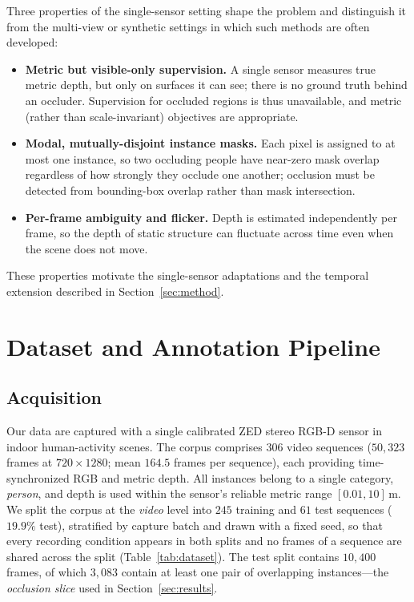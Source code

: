 \documentclass[sigconf, review=true]{acmart}
\begin{document}
Three properties of the single-sensor setting shape the problem and distinguish
it from the multi-view or synthetic settings in which such methods are often
developed:
\begin{itemize}
  \item \textbf{Metric but visible-only supervision.} A single sensor measures
    true metric depth, but only on surfaces it can see; there is no ground truth
    behind an occluder. Supervision for occluded regions is thus unavailable,
    and metric (rather than scale-invariant) objectives are appropriate.
  \item \textbf{Modal, mutually-disjoint instance masks.} Each pixel is assigned
    to at most one instance, so two occluding people have near-zero mask overlap
    regardless of how strongly they occlude one another; occlusion must be
    detected from bounding-box overlap rather than mask intersection.
  \item \textbf{Per-frame ambiguity and flicker.} Depth is estimated
    independently per frame, so the depth of static structure can fluctuate
    across time even when the scene does not move.
\end{itemize}
These properties motivate the single-sensor adaptations and the temporal
extension described in Section~\ref{sec:method}.

\section{Dataset and Annotation Pipeline}
\label{sec:dataset}

\subsection{Acquisition}
Our data are captured with a single calibrated ZED stereo RGB-D sensor in
indoor human-activity scenes. The corpus comprises $306$ video sequences
($50{,}323$ frames at $720\times1280$; mean $164.5$ frames per sequence),
each providing time-synchronized RGB and metric depth. All instances belong to
a single category, \emph{person}, and depth is used within the sensor's
reliable metric range $[0.01,10]\,$m. We split the corpus at the \emph{video}
level into $245$ training and $61$ test sequences ($19.9\%$ test), stratified by
capture batch and drawn with a fixed seed, so that every recording condition
appears in both splits and no frames of a sequence are shared across the split
(Table~\ref{tab:dataset}). The test split contains $10{,}400$ frames, of which
$3{,}083$ contain at least one pair of overlapping instances---the
\emph{occlusion slice} used in Section~\ref{sec:results}.
\end{document}
